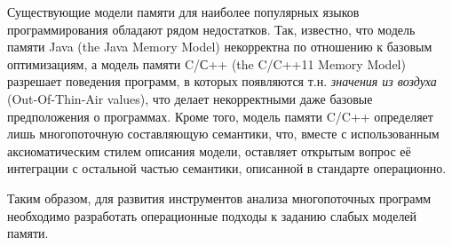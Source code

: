 

Существующие модели памяти для наиболее популярных языков программирования обладают рядом недостатков.
Так, известно, что модель памяти Java (the Java Memory Model) некорректна по отношению
к базовым оптимизациям, а модель памяти C/С++ (the C/C++11 Memory Model) разрешает
поведения программ, в которых появляются т.н. \emph{значения из воздуха} (Out-Of-Thin-Air values),
что делает некорректными даже базовые предположения о программах.
Кроме того, модель памяти C/C++ определяет лишь многопоточную составляющую семантики, что, вместе с
использованным аксиоматическим стилем описания модели, оставляет открытым вопрос её интеграции с остальной частью семантики,
описанной в стандарте операционно.

Таким образом, для развития инструментов анализа многопоточных программ необходимо
разработать операционные подходы к заданию слабых моделей памяти.



